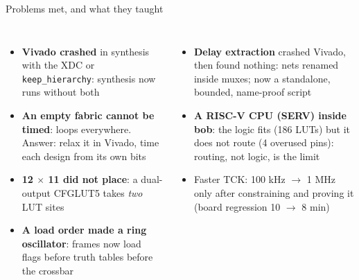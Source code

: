 \documentclass[aspectratio=169,11pt]{beamer}
\begin{document}
\begin{frame}{Problems met, and what they taught}
  \small
  \begin{columns}[T]
    \begin{itemize}
      \item \textbf{Vivado crashed} in synthesis with the XDC or \texttt{keep\_hierarchy}: synthesis now runs without both
      \item \textbf{An empty fabric cannot be timed}: loops everywhere. Answer: relax it in Vivado, time each design from its own bits
      \item \textbf{12 $\times$ 11 did not place}: a dual-output CFGLUT5 takes \emph{two} LUT sites
      \item \textbf{A load order made a ring oscillator}: frames now load flags before truth tables before the crossbar
    \end{itemize}
    \begin{itemize}
      \item \textbf{Delay extraction} crashed Vivado, then found nothing: nets renamed inside muxes; now a standalone, bounded, name-proof script
      \item \textbf{A RISC-V CPU (SERV) inside bob}: the logic fits (186 LUTs) but it does not route (4 overused pins): \alert{routing, not logic, is the limit}
      \item Faster TCK: 100 kHz $\rightarrow$ 1 MHz only after constraining and proving it (board regression 10 $\rightarrow$ 8 min)
    \end{itemize}
  \end{columns}
\end{frame}
\end{document}
